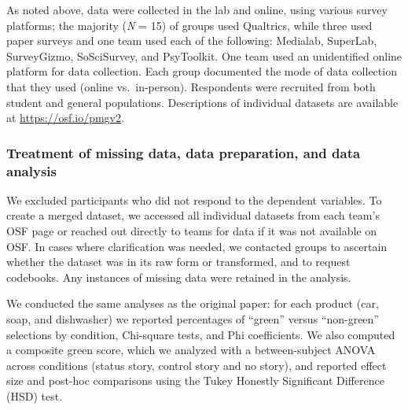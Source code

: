\documentclass[
]{article}
\begin{document}
As noted above, data were collected in the lab and online, using various
survey platforms; the majority (\emph{N} = 15) of groups used Qualtrics,
while three used paper surveys and one team used each of the following:
Medialab, SuperLab, SurveyGizmo, SoSciSurvey, and PsyToolkit. One team
used an unidentified online platform for data collection. Each group
documented the mode of data collection that they used (online
vs.~in-person). Respondents were recruited from both student and general
populations. Descriptions of individual datasets are available at
\url{https://osf.io/pmgv2}.

\subsubsection{Treatment of missing data, data preparation, and data
analysis}\label{treatment-of-missing-data-data-preparation-and-data-analysis}

We excluded participants who did not respond to the dependent variables.
To create a merged dataset, we accessed all individual datasets from
each team's OSF page or reached out directly to teams for data if it was
not available on OSF. In cases where clarification was needed, we
contacted groups to ascertain whether the dataset was in its raw form or
transformed, and to request codebooks. Any instances of missing data
were retained in the analysis.

We conducted the same analyses as the original paper: for each product
(car, soap, and dishwasher) we reported percentages of ``green'' versus
``non-green'' selections by condition, Chi-square tests, and Phi
coefficients. We also computed a composite green score, which we
analyzed with a between-subject ANOVA across conditions (status story,
control story and no story), and reported effect size and post-hoc
comparisons using the Tukey Honestly Significant Difference (HSD) test.
\end{document}
